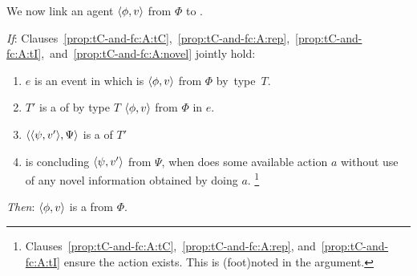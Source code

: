 \begin{note}
  We now link an agent \tCV{} \(\langle \phi, v \rangle\) from \(\Phi\) to .

  \begin{proposition}
    \label{prop:tC-and-fc}

    \noindent%

    \begin{itenum}
    \item[\emph{If}:]
      Clauses~\ref{prop:tC-and-fc:A:tC},~\ref{prop:tC-and-fc:A:rep},~\ref{prop:tC-and-fc:A:tI},~and~\ref{prop:tC-and-fc:A:novel} jointly hold:
      \begin{enumerate}[label=\arabic*., ref=(\arabic*)]
      \item
        \label{prop:tC-and-fc:A:tC}
        \(e\) is an event in which \vAgent{} is  \(\langle \phi, v \rangle\) from \(\Phi\) by~type~\(T\).
      \item
        \label{prop:tC-and-fc:A:rep}
        \(T'\) is a \emph{\tRep{}} of \vAgent{} \tCV{} by type \(T\) \(\langle \phi, v \rangle\) from \(\Phi\) in \(e\).
      \item
        \label{prop:tC-and-fc:A:tI}
        \(\langle \langle \psi, v' \rangle, \Psi \rangle\) is a \tI{} of \(T'\)
      \item
        \label{prop:tC-and-fc:A:novel}
        \vAgent{} is concluding \(\langle \psi, v' \rangle\) from \(\Psi\), when \vAgent{} does some available action \(a\) without use of any novel information obtained by doing \(a\).%
        \footnote{
          Clauses~\ref{prop:tC-and-fc:A:tC},~\ref{prop:tC-and-fc:A:rep}, and~\ref{prop:tC-and-fc:A:tI} ensure the action exists.
          This is (foot)noted in the argument.
        }
      \end{enumerate}
    \item[\emph{Then}:]
      \(\langle \phi, v \rangle\) is a \fc{} from \(\Phi\).
    \end{itenum}
    \vspace{-\baselineskip}
  \end{proposition}


\end{note}

